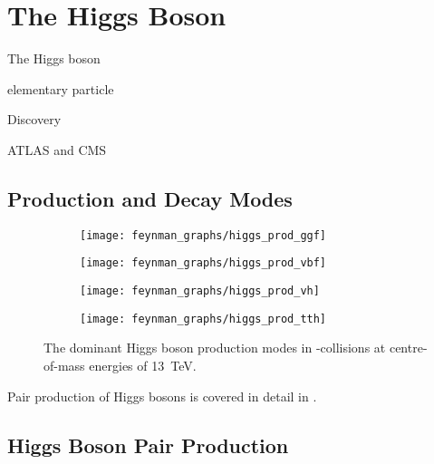 \section{The Higgs Boson}

The Higgs boson



elementary particle


Discovery

ATLAS \cite{HIGG-2012-27} and CMS \cite{CMS-HIG-12-028}




\subsection{Production and Decay Modes}

\begin{figure}[htbp]
  \centering

  \begin{subfigure}{0.45\textwidth}
    \centering
    \texttt{[image: feynman\_graphs/higgs\_prod\_ggf]}
  \end{subfigure}%
  \begin{subfigure}{0.45\textwidth}
    \centering
    \texttt{[image: feynman\_graphs/higgs\_prod\_vbf]}
  \end{subfigure}

  \begin{subfigure}{0.45\textwidth}
    \centering
    \texttt{[image: feynman\_graphs/higgs\_prod\_vh]}
  \end{subfigure}%
  \begin{subfigure}{0.45\textwidth}
    \centering
    \texttt{[image: feynman\_graphs/higgs\_prod\_tth]}
  \end{subfigure}%

  \caption{The dominant Higgs boson production modes in \pp-collisions at
    centre-of-mass energies of \SI{13}{\TeV}.}
\end{figure}


Pair production of Higgs bosons is covered in detail in
.



\subsection{Higgs Boson Pair Production}
\label{fig:theory_higgs_pair_prod}

